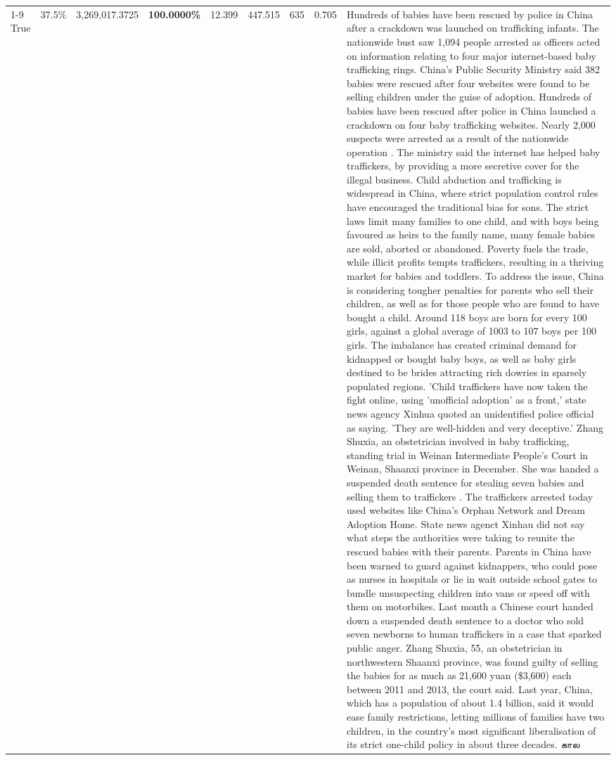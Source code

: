 \begin{table}[H]
\begin{tabular}{lllrlllll}
\cline{1-9}
True & 37.5\% & 3,269,017.3725 & \bfseries \color{red} 100.0000\% & 12.399 & 447.515 & 635 & 0.705 & Hundreds of babies have been rescued by police in China after a crackdown was launched on trafficking infants. The nationwide bust saw 1,094 people arrested as officers acted on information relating to four major internet-based baby trafficking rings. China's Public Security Ministry said 382 babies were rescued after four websites were found to be selling children under the guise of adoption. Hundreds of babies have been rescued after police in China launched a crackdown on four baby trafficking websites. Nearly 2,000 suspects were arrested as a result of the nationwide operation . The ministry said the internet has helped baby traffickers, by providing a more secretive cover for the illegal business. Child abduction and trafficking is widespread in China, where strict population control rules have encouraged the traditional bias for sons. The strict laws limit many families to one child, and with boys being favoured as heirs to the family name, many female babies are sold, aborted or abandoned. Poverty fuels the trade, while illicit profits tempts traffickers, resulting in a thriving market for babies and toddlers. To address the issue, China is considering tougher penalties for parents who sell their children, as well as for those people who are found to have bought a child. Around 118 boys are born for every 100 girls, against a global average of 1003 to 107 boys per 100 girls. The imbalance has created criminal demand for kidnapped or bought baby boys, as well as baby girls destined to be brides attracting rich dowries in sparsely populated regions. 'Child traffickers have now taken the fight online, using 'unofficial adoption' as a front,' state news agency Xinhua quoted an unidentified police official as saying. 'They are well-hidden and very deceptive.' Zhang Shuxia, an obstetrician involved in baby trafficking, standing trial in Weinan Intermediate People's Court in Weinan, Shaanxi province in December. She was handed a suspended death sentence for stealing seven babies and selling them to traffickers . The traffickers arrested today used websites like China's Orphan Network and Dream Adoption Home. State news agenct Xinhau did not say what steps the authorities were taking to reunite the rescued babies with their parents. Parents in China have been warned to guard against kidnappers, who could pose as nurses in hospitals or lie in wait outside school gates to bundle unsuspecting children into vans or speed off with them on motorbikes. Last month a Chinese court handed down a suspended death sentence to a doctor who sold seven newborns to human traffickers in a case that sparked public anger. Zhang Shuxia, 55, an obstetrician in northwestern Shaanxi province, was found guilty of selling the babies for as much as 21,600 yuan (\$3,600) each between 2011 and 2013, the court said. Last year, China, which has a population of about 1.4 billion, said it would ease family restrictions, letting millions of families have two children, in the country's most significant liberalisation of its strict one-child policy in about three decades. கால \\

\end{tabular}
\end{table}
